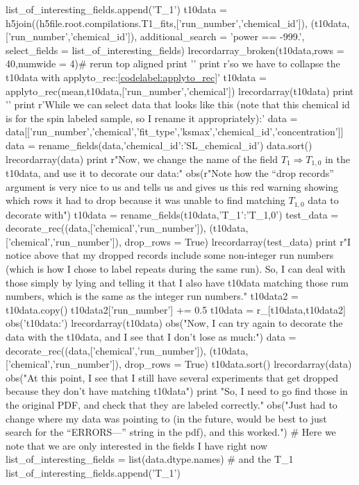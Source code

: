 \begin{python}
list_of_interesting_fields.append('T_1')
t10data = h5join((h5file.root.compilations.T1_fits,['run_number','chemical_id']),
    (t10data,['run_number','chemical_id']),
    additional_search = 'power == -999.',
    select_fields = list_of_interesting_fields)
lrecordarray_broken(t10data,rows = 40,numwide = 4)# rerun top aligned
print '\n\n'
print r'so we have to collapse the t10data with applyto\_rec:\ref{codelabel:applyto_rec}'
t10data = applyto_rec(mean,t10data,['run_number','chemical'])
lrecordarray(t10data)
print '\n\n'
print r'While we can select data that looks like this (note that this chemical id is for the spin labeled sample, so I rename it appropriately):'
data = data[['run_number','chemical','fit_type','ksmax','chemical_id','concentration']]
data = rename_fields(data,{'chemical_id':'SL_chemical_id'})
data.sort()
lrecordarray(data)
print r"Now, we change the name of the field $T_1\Rightarrow T_{1,0}$ in the t10data, and use it to decorate our data:"
obs(r"{\small Note how the ``drop records'' argument is very nice to us and tells us and gives us this red warning showing which rows it had to drop because it was unable to find matching $T_{1,0}$ data to decorate with}")
t10data = rename_fields(t10data,{'T_1':'T_{1,0}'})
test_data = decorate_rec((data,['chemical','run_number']),
    (t10data,['chemical','run_number']),
    drop_rows = True)
lrecordarray(test_data)
print r"I notice above that my dropped records include some non-integer run numbers (which is how I chose to label repeats during the same run).  So, I can deal with those simply by lying and telling it that I also have t10data matching those rum numbers, which is the same as the integer run numbers."
t10data2 = t10data.copy()
t10data2['run_number'] += 0.5
t10data = r_[t10data,t10data2]
obs('t10data:')
lrecordarray(t10data)
obs("Now, I can try again to decorate the data with the t10data, and I see that I don't lose as much:")
data = decorate_rec((data,['chemical','run_number']),
    (t10data,['chemical','run_number']),
    drop_rows = True)
t10data.sort()
lrecordarray(data)
obs("At this point, I see that I still have several experiments that get dropped because they don't have matching t10data")
print "So, I need to go find those in the original PDF, and check that they are labeled correctly."
obs("Just had to change where my data was pointing to (in the future, would be best to just search for the ``ERRORS---'' string in the pdf), and this worked.")
# Here we note that we are only interested in the fields I have right now
list_of_interesting_fields = list(data.dtype.names)
# and the T_1
list_of_interesting_fields.append('T_1')

\end{python}
